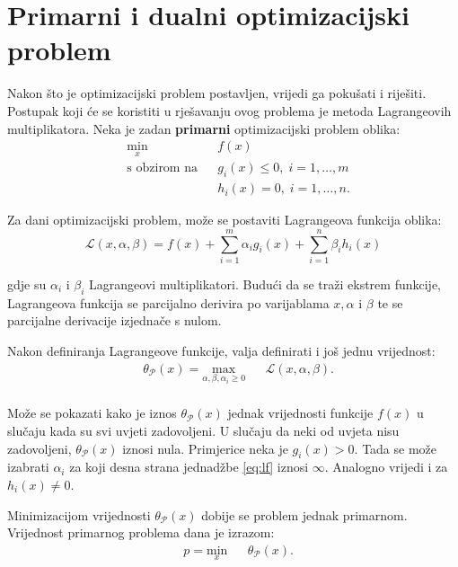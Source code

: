 \documentclass[times, utf8, zavrsni, numeric]{fer}
\begin{document}
\section{Primarni i dualni optimizacijski problem}  \label{sec:primdual}
Nakon što je optimizacijski problem postavljen, vrijedi ga pokušati i riješiti.
Postupak koji će se koristiti u rješavanju ovog problema je metoda Lagrangeovih multiplikatora.
Neka je zadan \textbf{primarni} optimizacijski problem oblika:
\begin{equation}
\begin{aligned}
& \underset{x}{\text{min}}
& & f(x)\\
& \text{s obzirom na}
& & g_i(x) \leq 0, \; i = 1, \ldots, m \\
&&& h_i(x) = 0, \; i = 1, \ldots, n.
\end{aligned}
\label{eq:lf}
\end{equation}

Za dani optimizacijski problem, može se postaviti Lagrangeova funkcija oblika:
\begin{equation}
\mathcal{L}(x, \alpha, \beta) = f(x) + \sum_{i=1}^{m}\alpha_ig_i(x) + \sum_{i=1}^{n}\beta_ih_i(x)
\end{equation}

gdje su $\alpha_i$ i $\beta_i$ Lagrangeovi multiplikatori.
Budući da se traži ekstrem funkcije, Lagrangeova funkcija se parcijalno derivira po varijablama $x, \alpha$
i $\beta$ te se parcijalne derivacije izjednače s nulom. 

\par Nakon definiranja Lagrangeove funkcije, valja definirati i još jednu vrijednost:
\begin{equation}
\begin{aligned}
& \theta_\mathcal{P}(x) = \underset{\alpha, \beta, \alpha_i \geq 0}{\text{max}}
& & \mathcal{L}(x, \alpha, \beta).\\
\end{aligned}
\end{equation}

Može se pokazati kako je iznos $\theta_\mathcal{P}(x)$ jednak vrijednosti funkcije $f(x)$ u slučaju kada su svi uvjeti
zadovoljeni. 
U slučaju da neki od uvjeta nisu zadovoljeni, $\theta_\mathcal{P}(x)$ iznosi nula.
Primjerice neka je $g_i(x) > 0$.
Tada se može izabrati $\alpha_i$ za koji desna strana jednadžbe \ref{eq:lf} iznosi $\infty$.
Analogno vrijedi i za $h_i(x) \neq 0$. 
\par Minimizacijom vrijednosti $\theta_\mathcal{P}(x)$ dobije se problem jednak primarnom.
Vrijednost primarnog problema dana je izrazom:
\begin{equation}
\begin{aligned}
& p = \underset{x}{\text{min}}
& & \theta_\mathcal{P}(x).\\
\end{aligned}
\end{equation}
\end{document}
